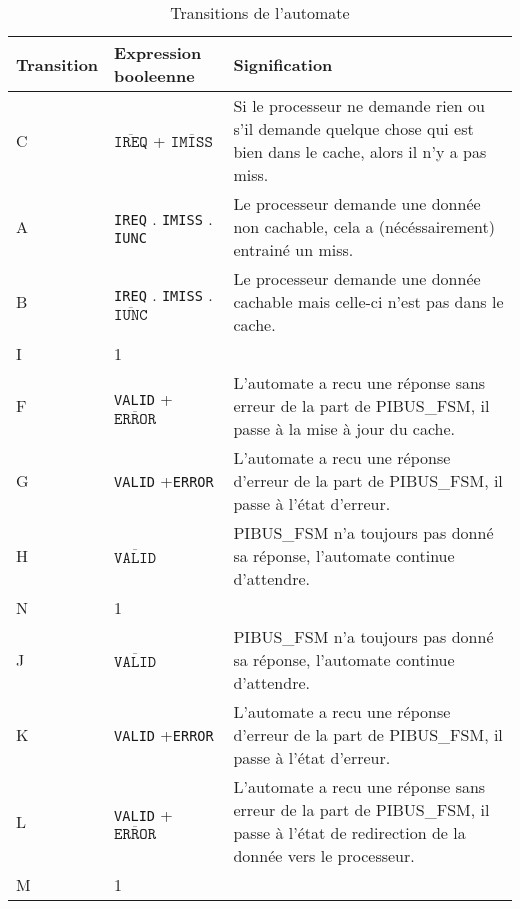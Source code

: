 \documentclass{article}
\begin{document}
\begin{table}[H]
\centering
\begingroup
\setlength{\tabcolsep}{5pt}
\renewcommand{\arraystretch}{1.1}
\begin{tabular}{| l | l | p{12cm} |}

\hline
Transition & Expression booleenne & Signification \\
\hline
\hline
C
&
$\overline{\texttt{IREQ}}$ + $\overline{\texttt{IMISS}}$
&
Si le processeur ne demande rien ou s'il demande quelque chose qui est bien
dans le cache, alors il n'y a pas miss.
\\
\hline

A
&
\texttt{IREQ}  . \texttt{IMISS}  . \texttt{IUNC}  
&
Le processeur demande une donnée non cachable, cela a (nécéssairement) entrainé
un miss.
\\
\hline

B
&
\texttt{IREQ}  . \texttt{IMISS}  . $\overline{\texttt{IUNC}}$
&
Le processeur demande une donnée cachable mais celle-ci n'est pas dans le cache.
\\
\hline
\hline
I
&
1
&
\\
\hline

F
&
\texttt{VALID}  + $\overline{\texttt{ERROR}}$
&
L'automate a recu une réponse sans erreur de la part de PIBUS\_FSM,
il passe à la mise à jour du cache.
\\
\hline

G
&
\texttt{VALID}  +\texttt{ERROR}  
&
L'automate a recu une réponse d'erreur de la part de PIBUS\_FSM,
il passe à l'état d'erreur.
\\
\hline

H
&
 $\overline{\texttt{VALID}}$
&
PIBUS\_FSM n'a toujours pas donné sa réponse, l'automate continue d'attendre.
\\
\hline

N
&
1
&
\\

\hline
\hline

J
&
 $\overline{\texttt{VALID}}$
&
PIBUS\_FSM n'a toujours pas donné sa réponse, l'automate continue d'attendre.
\\
\hline

K
&
\texttt{VALID}  +\texttt{ERROR}  
&
L'automate a recu une réponse d'erreur de la part de PIBUS\_FSM,
il passe à l'état d'erreur.
\\
\hline

L
&
\texttt{VALID}  + $\overline{\texttt{ERROR}}$
&
L'automate a recu une réponse sans erreur de la part de PIBUS\_FSM,
il passe à l'état de redirection de la donnée vers le processeur.
\\
\hline

M
&
1
&
\\
\hline

\end{tabular}
\caption{Transitions de l'automate}
\endgroup
\end{table}
\end{document}

